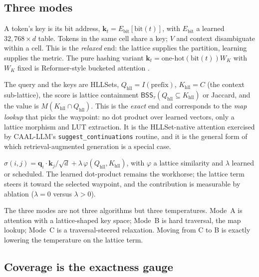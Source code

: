 \documentclass[11pt,a4paper]{article}
\theoremstyle{remark}
\newcommand{\BSS}{\ensuremath{\mathsf{BSS}}}           %
\newcommand{\q}{\ensuremath{\mathbf{q}}}                %
\renewcommand{\k}{\ensuremath{\mathbf{k}}}              %
\newcommand{\sigm}{\ensuremath{\sigma}}                 %
\begin{document}
\subsection{Three modes}

\begin{description}[leftmargin=*,style=nextline]
  \item[Mode A (address-key, tier 1).] A token's key is its bit address,
    $\k_t=E_{\mathrm{bit}}[\mathrm{bit}(t)]$, with $E_{\mathrm{bit}}$ a learned
    $32{,}768\times d$ table. Tokens in the same cell share a key; $V$ and
    context disambiguate within a cell. This is the \emph{relaxed} end: the
    lattice supplies the partition, learning supplies the metric. The pure
    hashing variant $\k_t=\text{one-hot}(\mathrm{bit}(t))W_K$ with $W_K$ fixed
    is Reformer-style bucketed attention \cite{kitaev2020}.
  \item[Mode B (set-key, tier 2/3).] The query and the keys are HLLSets,
    $Q_{\mathrm{hll}}=I(\text{prefix})$, $K_{\mathrm{hll}}=C$ (the context
    sub-lattice), the score is lattice containment $\BSS_\tau(Q_{\mathrm{hll}}
    \subseteq K_{\mathrm{hll}})$ or Jaccard, and the value is
    $M(K_{\mathrm{hll}}\cap Q_{\mathrm{hll}})$. This is the \emph{exact} end
    and corresponds to the \emph{map lookup} that picks the waypoint: no dot
    product over learned vectors, only a lattice morphism and LUT extraction. It
    is the HLLSet-native attention exercised by CAAL-LLM's
    \texttt{suggest\_continuations} routine, and it is the general form of which
    retrieval-augmented generation \cite{lewis2020} is a special case.
  \item[Mode C (hybrid).] $\sigm(i,j)=\q_i\!\cdot\!\k_j/\sqrt{d}
    +\lambda\,\varphi(Q_{\mathrm{hll}},K_{\mathrm{hll}})$, with $\varphi$ a
    lattice similarity and $\lambda$ learned or scheduled. The learned
    dot-product remains the workhorse; the lattice term steers it toward the
    selected waypoint, and the contribution is measurable by ablation
    ($\lambda=0$ versus $\lambda>0$).
\end{description}

The three modes are not three algorithms but three temperatures. Mode~A is
attention with a lattice-shaped key space; Mode~B is hard traversal, the map
lookup; Mode~C is a traversal-steered relaxation. Moving from C to B is exactly
lowering the temperature on the lattice term.

\subsection{Coverage is the exactness gauge}
\end{document}
